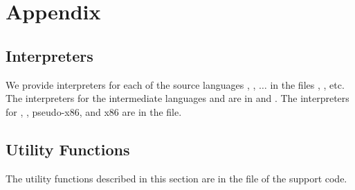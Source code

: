 \documentclass[11pt]{book}
\begin{document}


\chapter{Appendix}

\section{Interpreters}
\label{appendix:interp}

We provide interpreters for each of the source languages \LangInt{},
\LangVar{}, $\ldots$ in the files ,
, etc.  The interpreters for the intermediate
languages \LangCVar{} and \LangCIf{} are in  and
.  The interpreters for \LangCVec{}, \LangCFun{}, pseudo-x86,
and x86 are in the  file.

\section{Utility Functions}
\label{appendix:utilities}

The utility functions described in this section are in the
 file of the support code.

\paragraph{}
\end{document}
